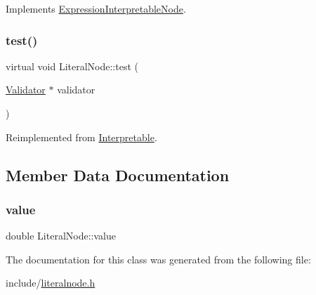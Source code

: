 Implements \hyperlink{classExpressionInterpretableNode_a43650f046c48fc539f77a207e3c9181e}{Expression\+Interpretable\+Node}.

\mbox{\label{classLiteralNode_af55e4e5e668c9be666c0b6c24c3918f9}} 
\subsubsection{\texorpdfstring{test()}{test()}}
{\footnotesize\ttfamily virtual void Literal\+Node\+::test (\begin{DoxyParamCaption}\item[{\hyperlink{classValidator}{Validator} $\ast$}]{validator }\end{DoxyParamCaption})\hspace{0.3cm}{\ttfamily [virtual]}}



Reimplemented from \hyperlink{classInterpretable_a32f547aaf68dcbab993284d3257ab010}{Interpretable}.



\subsection{Member Data Documentation}
\mbox{\label{classLiteralNode_aaead85ec08c6a4ec23534a547176a450}} 
\subsubsection{\texorpdfstring{value}{value}}
{\footnotesize\ttfamily double Literal\+Node\+::value}



The documentation for this class was generated from the following file\+:\begin{DoxyCompactItemize}
\item 
include/\hyperlink{literalnode_8h}{literalnode.\+h}\end{DoxyCompactItemize}
